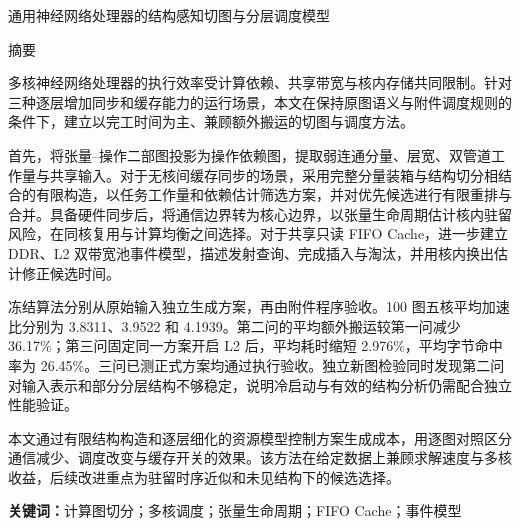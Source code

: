 \begin{center}
{\heiti 通用神经网络处理器的结构感知切图与分层调度模型}\par\medskip
{\heiti 摘要}
\end{center}
多核神经网络处理器的执行效率受计算依赖、共享带宽与核内存储共同限制。针对三种逐层增加同步和缓存能力的运行场景，本文在保持原图语义与附件调度规则的条件下，建立以完工时间为主、兼顾额外搬运的切图与调度方法。

首先，将张量--操作二部图投影为操作依赖图，提取弱连通分量、层宽、双管道工作量与共享输入。对于无核间缓存同步的场景，采用完整分量装箱与结构切分相结合的有限构造，以任务工作量和依赖估计筛选方案，并对优先候选进行有限重排与合并。具备硬件同步后，将通信边界转为核心边界，以张量生命周期估计核内驻留风险，在同核复用与计算均衡之间选择。对于共享只读 FIFO Cache，进一步建立 DDR、L2 双带宽池事件模型，描述发射查询、完成插入与淘汰，并用核内换出估计修正候选时间。

冻结算法分别从原始输入独立生成方案，再由附件程序验收。100 图五核平均加速比分别为 3.8311、3.9522 和 4.1939。第二问的平均额外搬运较第一问减少 36.17\%；第三问固定同一方案开启 L2 后，平均耗时缩短 2.976\%，平均字节命中率为 26.45\%。三问已测正式方案均通过执行验收。独立新图检验同时发现第二问对输入表示和部分分层结构不够稳定，说明冷启动与有效的结构分析仍需配合独立性能验证。

本文通过有限结构构造和逐层细化的资源模型控制方案生成成本，用逐图对照区分通信减少、调度改变与缓存开关的效果。该方法在给定数据上兼顾求解速度与多核收益，后续改进重点为驻留时序近似和未见结构下的候选选择。

\textbf{关键词：}计算图切分；多核调度；张量生命周期；FIFO Cache；事件模型

